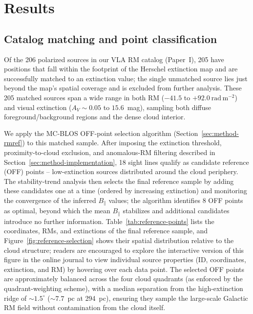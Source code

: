 \documentclass[twocolumn]{aastex631}
\begin{document}
\section{Results}
\label{sec:results}

\subsection{Catalog matching and point classification}

Of the 206 polarized sources in our VLA RM catalog (Paper~I), 205 have positions that fall within the footprint of the Herschel extinction map and are successfully matched to an extinction value; the single unmatched source lies just beyond the map's spatial coverage and is excluded from further analysis. These 205 matched sources span a wide range in both RM ($-41.5$ to $+92.0~\mathrm{rad\,m^{-2}}$) and visual extinction ($A_V \sim 0.05$ to $15.6$~mag), sampling both diffuse foreground/background regions and the dense cloud interior.

We apply the MC-BLOS OFF-point selection algorithm (Section~\ref{sec:method-rmref}) to this matched sample. After imposing the extinction threshold, proximity-to-cloud exclusion, and anomalous-RM filtering described in Section~\ref{sec:method-implementation}, 18 sight lines qualify as candidate reference (OFF) points -- low-extinction sources distributed around the cloud periphery. The stability-trend analysis then selects the final reference sample by adding these candidates one at a time (ordered by increasing extinction) and monitoring the convergence of the inferred $B_\parallel$ values; the algorithm identifies 8 OFF points as optimal, beyond which the mean $B_\parallel$ stabilizes and additional candidates introduce no further information. Table~\ref{tab:reference-points} lists the coordinates, RMs, and extinctions of the final reference sample, and Figure~\ref{fig:reference-selection} shows their spatial distribution relative to the cloud structure; readers are encouraged to explore the interactive version of this figure in the online journal to view individual source properties (ID, coordinates, extinction, and RM) by hovering over each data point. The selected OFF points are approximately balanced across the four cloud quadrants (as enforced by the quadrant-weighting scheme), with a median separation from the high-extinction ridge of $\sim1.5^\circ$ ($\sim7.7$~pc at 294~pc), ensuring they sample the large-scale Galactic RM field without contamination from the cloud itself.
\end{document}
